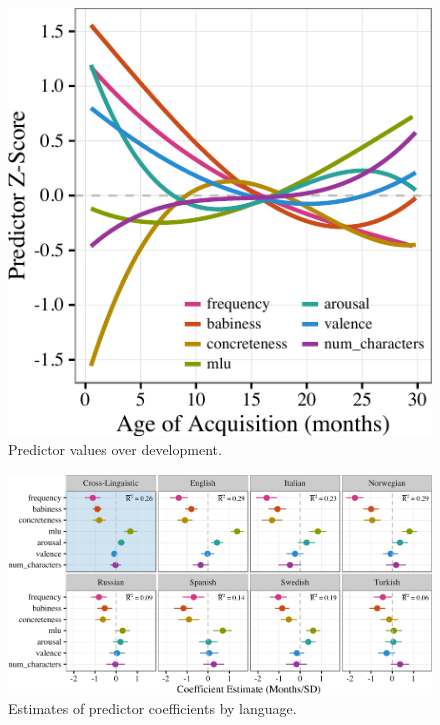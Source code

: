 \documentclass[10pt, letterpaper]{article}
\newenvironment{CodeChunk}{}{}
\begin{document}
\begin{CodeChunk}
\begin{figure}[!hb]

{\centering \includegraphics{figs/devo-1} 

}

\caption[Predictor values over development]{Predictor values over development.}\label{fig:devo}
\end{figure}
\end{CodeChunk}

\begin{CodeChunk}
\begin{figure}[tb]

{\centering \includegraphics{figs/coefs-1} 

}

\caption[Estimates of predictor coefficients by language]{Estimates of predictor coefficients by language.}\label{fig:coefs}
\end{figure}
\end{CodeChunk}
\end{document}
